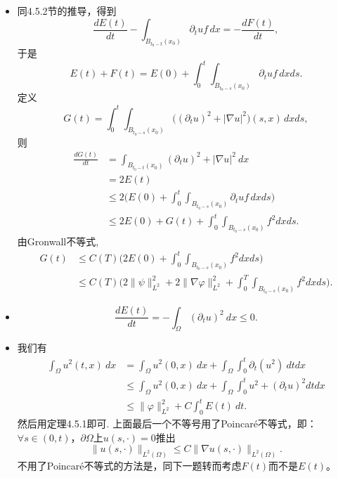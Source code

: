 \begin{itemize}
\item[1.] 同4.5.2节的推导，得到
$$\frac{dE(t)}{dt}-\int_{B_{t_0-t}(x_0)}\partial_t uf\,dx
=-\frac{dF(t)}{dt},$$
于是$$E(t)+F(t)=E(0)+\int_0^t\int_{B_{t_0-s}(x_0)}\partial_t uf\,dxds.$$
定义$$G(t)=\int_0^t\int_{B_{t_0-s}(x_0)}
\big((\partial_t u)^2+|\nabla u|^2\big)(s,x)\,dxds,$$
则\begin{align*}
    \frac{dG(t)}{dt}
    &=\int_{B_{t_0-t}(x_0)}(\partial_t u)^2+|\nabla u|^2\>dx\\
    &=2E(t)\\
    &\leqslant2\big(E(0)+\int_0^t\int_{B_{t_0-s}(x_0)}\partial_t uf\,dxds\big)\\
    &\leqslant2E(0)+G(t)+\int_0^t\int_{B_{t_0-s}(x_0)}f^2dxds.
\end{align*}
由Gronwall不等式,
\begin{align*}
    G(t)&\leqslant C(T)\big(2E(0)+\int_0^t\int_{B_{t_0-s}(x_0)}f^2dxds\big)\\
    &\leqslant C(T)\big(2\|\psi\|_{L^2}^2+2\|\nabla\varphi\|_{L^2}^2
    +\int_0^T\int_{B_{t_0-s}(x_0)}f^2dxds\big).
\end{align*}

\item[2.] $$\frac{dE(t)}{dt}=-\int_\varOmega(\partial_t u)^2\>dx\leqslant0.$$

\item[3.] 我们有
\begin{align*}
    \int_\varOmega u^2(t,x)\>dx
    &=\int_\varOmega u^2(0,x)\>dx+\int_\varOmega\int_0^t\partial_t(u^2)\>dtdx\\
    &\leqslant\int_\varOmega u^2(0,x)\>dx+\int_\varOmega\int_0^t u^2+(\partial_t u)^2dtdx\\
    &\leqslant\|\varphi\|_{L^2}^2+C\int_0^t\!E(t)\>dt.
\end{align*}
然后用定理4.5.1即可. 上面最后一个不等号用了Poincaré不等式，即：
$\forall s\in(0,t)$，$\partial\varOmega$上$u(s,\cdot)=0$推出
\[\|u(s,\cdot)\|_{L^2(\varOmega)} \leqslant C\|\nabla u(s,\cdot)\|_{L^2(\varOmega)}.\]
不用了Poincaré不等式的方法是，同下一题转而考虑$F(t)$而不是$E(t)$。


\end{itemize}

